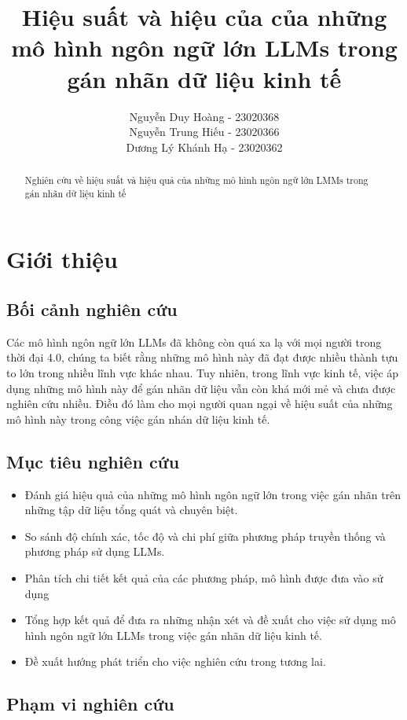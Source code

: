 \documentclass{article} %
\title{Hiệu suất và hiệu của của những mô hình ngôn ngữ lớn LLMs trong gán nhãn dữ liệu kinh tế}
\author{
    Nguyễn Duy Hoàng - 23020368\\
    Nguyễn Trung Hiếu - 23020366\\
    Dương Lý Khánh Hạ - 23020362
}
\begin{document}
\maketitle
\tableofcontents


\begin{abstract}
    Nghiên cứu về hiệu suất và hiệu quả của những mô hình ngôn ngữ lớn LMMs trong gán nhãn dữ liệu kinh tế
\end{abstract}

\section{\textbf{Giới thiệu}}
\subsection{Bối cảnh nghiên cứu}

Các mô hình ngôn ngữ lớn LLMs đã không còn quá xa lạ với mọi người trong thời đại 4.0, 
chúng ta biết rằng những mô hình này đã đạt được nhiều thành tựu to lớn trong nhiều lĩnh vực khác nhau.
Tuy nhiên, trong lĩnh vực kinh tế, việc áp dụng những mô hình này để gán nhãn dữ liệu vẫn còn khá mới mẻ
và chưa được nghiên cứu nhiều. Điều đó làm cho mọi người quan ngại về hiệu suất của những mô hình này trong 
công việc gán nhán dữ liệu kinh tế.

\subsection{Mục tiêu nghiên cứu}

\begin{itemize}

\item Đánh giá hiệu quả của những mô hình ngôn ngữ lớn trong việc gán nhãn trên những tập dữ liệu 
tổng quát và chuyên biệt.
\item So sánh độ chính xác, tốc độ và chi phí giữa phương pháp truyền thống và phương pháp sử dụng LLMs.
\item Phân tích chi tiết kết quả của các phương pháp, mô hình được đưa vào sử dụng
\item Tổng hợp kết quả để đưa ra những nhận xét và đề xuất cho việc sử dụng mô hình ngôn ngữ lớn LLMs trong việc gán nhãn dữ liệu kinh tế.
\item Đề xuất hướng phát triển cho việc nghiên cứu trong tương lai.

\end{itemize}

\subsection{Phạm vi nghiên cứu}
\end{document}
